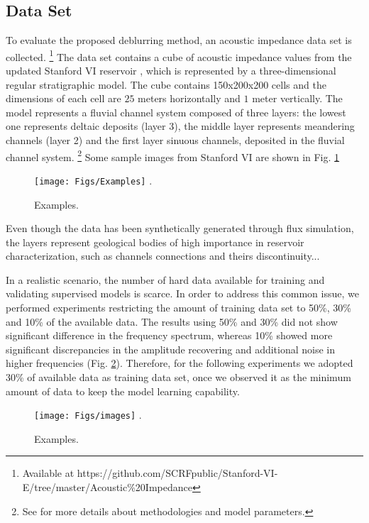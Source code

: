 \documentclass[journal]{IEEEtran}
\begin{document}
\subsection{Data Set}
To evaluate the proposed deblurring method, an acoustic
impedance data set is collected. \footnote{Available at https://github.com/SCRFpublic/Stanford-VI-E/tree/master/Acoustic\%20Impedance} %
The data set contains a cube of acoustic impedance values from the updated Stanford VI reservoir \cite{Lee2012}, which is represented by a three-dimensional regular stratigraphic model. The cube contains 150x200x200 cells and the dimensions of each cell are $25$ meters horizontally and $1$ meter vertically. The model represents a fluvial channel system composed of three layers: the lowest one represents deltaic deposits (layer 3), the middle layer represents meandering channels (layer 2) and the first layer sinuous channels, deposited in the fluvial channel system. \footnote{See \cite{Castro2005} for more details about methodologies and model parameters.} Some sample images from Stanford VI are shown in Fig. \ref{fig_examples}
\begin{figure}[!t]
\centering
\texttt{[image: Figs/Examples]}
\DeclareGraphicsExtensions.
\caption{Examples.}
\label{fig_examples}
\end{figure}
Even though the data has been synthetically generated through flux
simulation, the layers represent geological bodies of high importance
in reservoir characterization, such as channels connections and theirs
discontinuity...

In a realistic scenario, the number of hard data available for
training and validating supervised models is scarce. In order
to address this common issue, we performed experiments
restricting the amount of training data set to 50\%, 30\% and
10\% of the available data. The results using 50\% and 30\% did
not show significant difference in the frequency spectrum,
whereas 10\% showed more significant discrepancies in the
amplitude recovering and additional noise in higher frequencies
(Fig. \ref{fig_imgs}). Therefore, for the following experiments
we adopted 30\% of available data as training data set, once we
observed it as the minimum amount of data to keep the model learning
capability.
\begin{figure}[!t]
\centering
\texttt{[image: Figs/images]}
\DeclareGraphicsExtensions.
\caption{Examples.}
\label{fig_imgs}
\end{figure}
\end{document}

